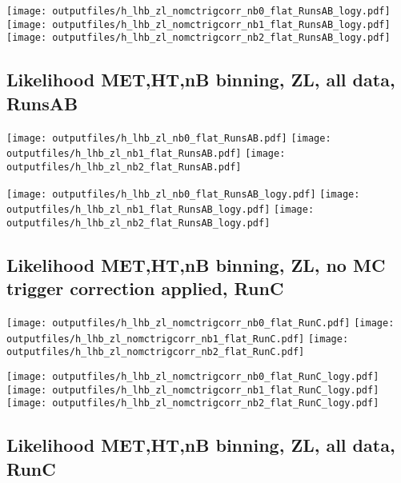 \documentclass[11pt]{article}
\begin{document}
    \noindent
     \texttt{[image: outputfiles/h\_lhb\_zl\_nomctrigcorr\_nb0\_flat\_RunsAB\_logy.pdf]}
     \texttt{[image: outputfiles/h\_lhb\_zl\_nomctrigcorr\_nb1\_flat\_RunsAB\_logy.pdf]}
     \texttt{[image: outputfiles/h\_lhb\_zl\_nomctrigcorr\_nb2\_flat\_RunsAB\_logy.pdf]}


    \subsection{ Likelihood MET,HT,nB binning, ZL, all data, RunsAB }

    \noindent
     \texttt{[image: outputfiles/h\_lhb\_zl\_nb0\_flat\_RunsAB.pdf]}
     \texttt{[image: outputfiles/h\_lhb\_zl\_nb1\_flat\_RunsAB.pdf]}
     \texttt{[image: outputfiles/h\_lhb\_zl\_nb2\_flat\_RunsAB.pdf]}

    \noindent
     \texttt{[image: outputfiles/h\_lhb\_zl\_nb0\_flat\_RunsAB\_logy.pdf]}
     \texttt{[image: outputfiles/h\_lhb\_zl\_nb1\_flat\_RunsAB\_logy.pdf]}
     \texttt{[image: outputfiles/h\_lhb\_zl\_nb2\_flat\_RunsAB\_logy.pdf]}


    \subsection{ Likelihood MET,HT,nB binning, ZL, no MC trigger correction applied, RunC }

    \noindent
     \texttt{[image: outputfiles/h\_lhb\_zl\_nomctrigcorr\_nb0\_flat\_RunC.pdf]}
     \texttt{[image: outputfiles/h\_lhb\_zl\_nomctrigcorr\_nb1\_flat\_RunC.pdf]}
     \texttt{[image: outputfiles/h\_lhb\_zl\_nomctrigcorr\_nb2\_flat\_RunC.pdf]}

    \noindent
     \texttt{[image: outputfiles/h\_lhb\_zl\_nomctrigcorr\_nb0\_flat\_RunC\_logy.pdf]}
     \texttt{[image: outputfiles/h\_lhb\_zl\_nomctrigcorr\_nb1\_flat\_RunC\_logy.pdf]}
     \texttt{[image: outputfiles/h\_lhb\_zl\_nomctrigcorr\_nb2\_flat\_RunC\_logy.pdf]}


    \subsection{ Likelihood MET,HT,nB binning, ZL, all data, RunC }
\end{document}
